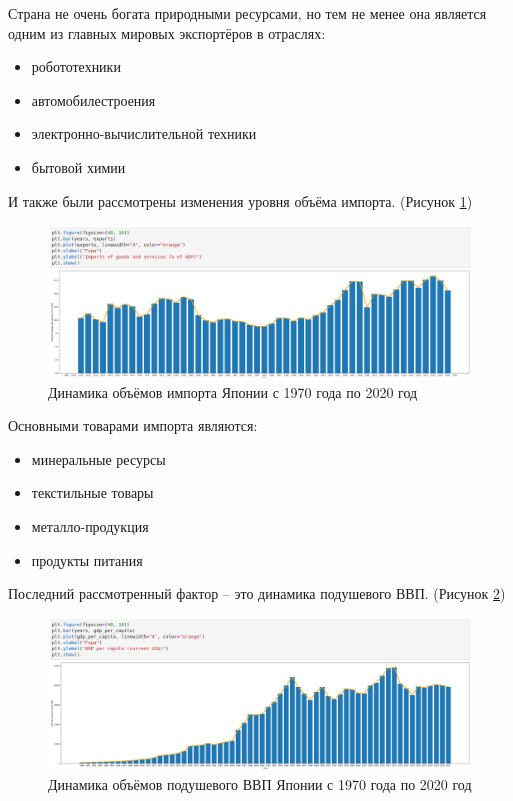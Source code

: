 \documentclass[14pt,fleqn]{extarticle}
\begin{document}
	Страна не очень богата природными ресурсами, но тем не менее она является одним из главных мировых экспортёров в отраслях:
	\begin{itemize}[topsep=0pt,itemsep=-1ex,partopsep=1ex,parsep=1ex]
		\item робототехники
		\item автомобилестроения
		\item электронно-вычислительной техники
		\item бытовой химии\\
	\end{itemize}

	И также были рассмотрены изменения уровня объёма импорта. (Рисунок \ref{fig:japan_import_plot})
	
	\begin{figure}[h]
		\centering \includegraphics[scale=0.42]{japan_import_plot}
		\caption{Динамика объёмов импорта Японии с 1970 года по 2020 год}
		\label{fig:japan_import_plot}
	\end{figure}

	\newpage
	
	Основными товарами импорта являются:
	\begin{itemize}[topsep=0pt,itemsep=-1ex,partopsep=1ex,parsep=1ex]
		\item минеральные ресурсы
		\item текстильные товары
		\item металло-продукция
		\item продукты питания\\
	\end{itemize}

	Последний рассмотренный фактор -- это динамика подушевого ВВП. (Рисунок \ref{fig:japan_gdp_per_capita_plot})
	
	\begin{figure}[h]
		\centering \includegraphics[scale=0.42]{japan_gdp_per_capita_plot}
		\caption{Динамика объёмов подушевого ВВП Японии с 1970 года по 2020 год}
		\label{fig:japan_gdp_per_capita_plot}
	\end{figure}
\end{document}

